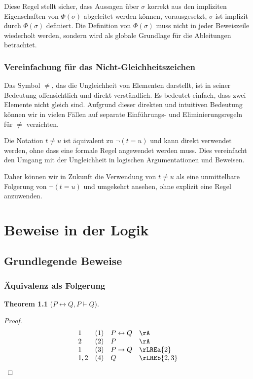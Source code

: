 \documentclass{book}
\theoremstyle{plain}
\newtheorem{theorem}{Theorem}
\theoremstyle{remark}
\theoremstyle{definition}
\begin{document}
Diese Regel stellt sicher, dass Aussagen über \(\sigma\) korrekt aus den impliziten Eigenschaften von \(\Phi(\sigma)\) abgeleitet werden können, vorausgesetzt, \(\sigma\) ist implizit durch \(\Phi(\sigma)\) definiert. Die Definition von \(\Phi(\sigma)\) muss nicht in jeder Beweiszeile wiederholt werden, sondern wird als globale Grundlage für die Ableitungen betrachtet.





\subsection{Vereinfachung für das Nicht-Gleichheitszeichen}
Das Symbol \(\neq\), das die Ungleichheit von Elementen darstellt, ist in seiner Bedeutung offensichtlich und direkt verständlich. Es bedeutet einfach, dass zwei Elemente nicht gleich sind. Aufgrund dieser direkten und intuitiven Bedeutung können wir in vielen Fällen auf separate Einführungs- und Eliminierungsregeln für \(\neq\) verzichten.

Die Notation \(t \neq u\) ist äquivalent zu \(\neg(t = u)\) und kann direkt verwendet werden, ohne dass eine formale Regel angewendet werden muss. Dies vereinfacht den Umgang mit der Ungleichheit in logischen Argumentationen und Beweisen.

Daher können wir in Zukunft die Verwendung von \(t \neq u\) als eine unmittelbare Folgerung von \(\neg(t = u)\) und umgekehrt ansehen, ohne explizit eine Regel anzuwenden.



\chapter{Beweise in der Logik}

\section{Grundlegende Beweise}

\subsection{Äquivalenz als Folgerung}
\label{PLrQwPImpQ}
\begin{theorem}[$P \leftrightarrow Q, P \vdash Q$]
\end{theorem}
\begin{proof}
	\[
	\begin{array}{llll}
		1 & (1) & P \leftrightarrow Q & \rA \\
		2 & (2) & P & \rA \\
		1 & (3) & P\rightarrow Q & \rLREa{2} \\
		1,2 & (4) & Q & \rLREb{2,3} \\
	\end{array}
	\]
\end{proof}
\end{document}
